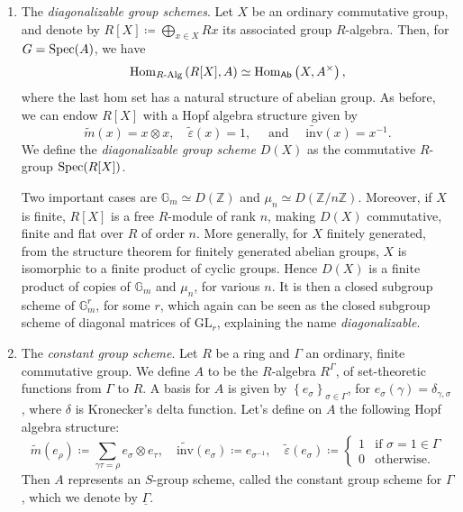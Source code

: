 \begin{ex}
\begin{enumerate}
		\item The \emph{diagonalizable group schemes}. Let $X$ be an ordinary
			commutative group, and denote by $R[X] \coloneqq \bigoplus_{x \in X} Rx$
			its associated group $R$-algebra.
			Then, for $G = \operatorname{Spec}(A)$, we have
			\begin{equation*}
				\operatorname{Hom}_{R \text{-Alg}} \left( R[X], A \right) \simeq
				\operatorname{Hom}_{\mathsf{Ab}} \left( X, A^{\times} \right)
			,\end{equation*} 
			where the last hom set has a natural structure of abelian
			group.
			As before, we can endow \(R [ X ]\) with a Hopf algebra structure
			given by
			\begin{equation*}
				\widetilde{m}(x) = x \otimes x,
				\quad
				\widetilde{\varepsilon}(x) = 1,
				\quad \text{ and } \quad
				\widetilde{\mathrm{inv}}(x) = x^{-1}
			.\end{equation*} 
			We define the \emph{diagonalizable group scheme} $D(X)$
			as the commutative $R$-group $\operatorname{Spec}(R[X])$.

			Two important cases are $\mathbb{G}_m \simeq D(\mathbb{Z})$
			and $\mu_n \simeq D(\mathbb{Z}/n\mathbb{Z})$.
			Moreover, if $X$ is finite, $R[X]$ is a free $R$-module of rank $n$,
			making $D(X)$ commutative, finite and flat over $R$
			of order \(n\).
			More generally, for $X$ finitely generated, 
			from the structure theorem for finitely generated abelian groups, 
			$X$ is isomorphic to a finite product of cyclic groups.
			Hence $D(X)$ is a finite product of copies of $\mathbb{G}_m$
			and $\mu_n$, for various $n$.
			It is then a closed subgroup scheme of $\mathbb{G}_m^r$, for some $r$,
			which again can be seen as the closed subgroup scheme of diagonal
			matrices of $\mathrm{GL}_r$, explaining the name 
			\emph{diagonalizable}.


		\item The \emph{constant group scheme}\label{ex:ConstantGroups}.
			Let $R$ be a ring and $\Gamma$ an ordinary, finite commutative group.
			We define $A$ to be the $R$-algebra $R^\Gamma$,
			of set-theoretic functions from $\Gamma$ to $R$.
			A basis for $A$ is given by $\left\{ e_\sigma \right\}_{\sigma \in \Gamma}$,
			for $e_\sigma(\gamma) = \delta_{\gamma,\sigma}$,
			where $\delta$ is Kronecker's delta function.
			Let's define on \(A\) the following Hopf algebra structure:
			\begin{equation*}
				\widetilde{m}(e_\rho) \coloneqq
				\sum_{\gamma\tau = \rho}^{} e_\sigma \otimes e_\tau, 
				\quad
				\widetilde{\mathrm{inv}}(e_\sigma) \coloneqq e_{\sigma^{-1}}, 
				\quad
				\widetilde{\varepsilon}(e_\sigma) \coloneqq
				\begin{cases}
					1 & \text{if } \sigma = 1 \in \Gamma\\
					0 & \text{otherwise}.
				\end{cases}
			\end{equation*}
			Then $A$ represents an $S$-group scheme,
			called the constant group scheme for $\Gamma$,
			which we denote by $\underline{\Gamma}$.



\end{enumerate}
\end{ex}
